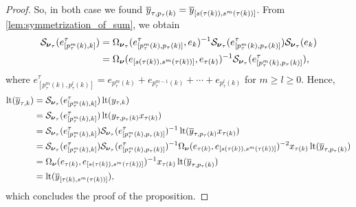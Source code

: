 \begin{proof}
	So, in both case we found $\overline{y}_{\tau, p_\tau(k)} = \overline{y}_{[s(\tau(k)), s^m(\tau(k))]}$.
	From \cref{lem:symmetrization_of_sum}, we obtain
	\begin{align*}
		\mathcal{S}_{\boldsymbol{\nu}_\tau}(e^\tau_{[p^m_\tau(k), k]})
		 & = \Omega_{\boldsymbol{\nu}_\tau}(e^\tau_{[p^m_\tau(k), p_\tau(k)]}, e_k)^{-1} \mathcal{S}_{\boldsymbol{\nu}_\tau}(e^\tau_{[p^m_\tau(k), p_\tau(k)]})\mathcal{S}_{\boldsymbol{\nu}_\tau}(e_k) \\
		 & = \Omega_{\boldsymbol{\nu}}(e_{[s(\tau(k)), s^m(\tau(k))]}, e_{\tau(k)})^{-1} \mathcal{S}_{\boldsymbol{\nu}_\tau}(e^\tau_{[p^m_\tau(k), p_\tau(k)]}),
	\end{align*}
	where $e^\tau_{[p^m_\tau(k), p^l_\tau(k)]} = e_{p^m _\tau(k)} + e_{p^{m-1}_\tau(k)} +
		\cdots + e_{p^l_\tau(k)}$ for $m \geq l \geq 0$. Hence,
	\begin{align*}
		\operatorname{lt}(\overline{y}_{\tau, k})
		 & = \mathcal{S}_{\boldsymbol{\nu}_\tau}(e^\tau_{[p^m_\tau(k), k]}) \operatorname{lt}(y_{\tau, k})                                                                                                                                              \\
		 & = \mathcal{S}_{\boldsymbol{\nu}_\tau}(e^\tau_{[p^m_\tau(k), k]}) \operatorname{lt}(y_{\tau, p_\tau(k)}x_{\tau(k)})                                                                                                                           \\
		 & = \mathcal{S}_{\boldsymbol{\nu}_\tau}(e^\tau_{[p^m_\tau(k), k]}) \mathcal{S}_{\boldsymbol{\nu}_\tau}(e^\tau_{[p^m_\tau(k), p_\tau(k)]})^{-1} \operatorname{lt}(\overline{y}_{\tau, p_\tau(k)}x_{\tau(k)})                                                                 \\
		 & = \mathcal{S}_{\boldsymbol{\nu}_\tau}(e^\tau_{[p^m_\tau(k), k]}) \mathcal{S}_{\boldsymbol{\nu}_\tau}(e^\tau_{[p^m_\tau(k), p_\tau(k)]})^{-1} \Omega_{\boldsymbol{\nu}}(e_{\tau(k)}, e_{[s(\tau(k)), s^m(\tau(k))]})^{-2} x_{\tau(k)}\operatorname{lt}(\overline{y}_{\tau, p_\tau(k)}) \\
		 & = \Omega_{\boldsymbol{\nu}}(e_{\tau(k)}, e_{[s(\tau(k)), s^m(\tau(k))]})^{-1} x_{\tau(k)}\operatorname{lt}(\overline{y}_{\tau, p_\tau(k)})                                                                                                      \\
		 & = \operatorname{lt}(\overline{y}_{[\tau(k), s^m(\tau(k))]}),
	\end{align*}
	which concludes the proof of the proposition.
\end{proof}

